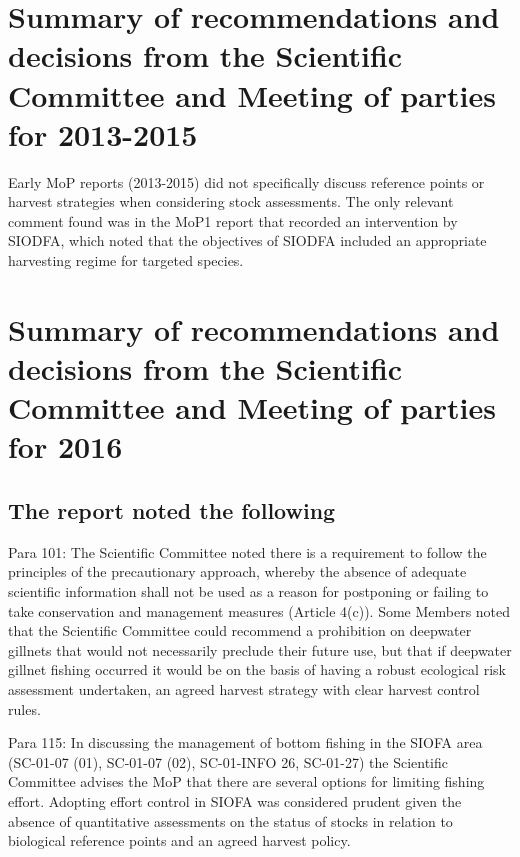 \section{Summary of recommendations and decisions from the Scientific Committee and Meeting of parties for 2013-2015}

Early MoP reports (2013-2015) did not specifically discuss reference points or harvest strategies when considering stock assessments. The only relevant comment found was in the MoP1 report \citep{MoP1} that recorded an intervention by SIODFA, which noted that the objectives of SIODFA included an appropriate harvesting regime for targeted species.

\section{Summary of recommendations and decisions from the Scientific Committee and Meeting of parties for 2016}

\subsection{The \cite{SC1} report noted the following}

Para 101: The Scientific Committee noted there is a requirement to follow the principles of the precautionary approach, whereby the absence of adequate scientific information shall not be used as a reason for postponing or failing to take conservation and management measures (Article 4(c)). Some Members noted that the Scientific Committee could recommend a prohibition on deepwater gillnets that would not necessarily preclude their future use, but that if deepwater gillnet fishing occurred it would be on the basis of having a robust ecological risk assessment undertaken, an agreed harvest strategy with clear harvest control rules.

Para 115: In discussing the management of bottom fishing in the SIOFA area (SC-01-07 (01), SC-01-07 (02), SC-01-INFO 26, SC-01-27) the Scientific Committee advises the MoP that there are several options for limiting fishing effort. Adopting effort control in SIOFA was considered prudent given the absence of quantitative assessments on the status of stocks in relation to biological reference points and an agreed harvest policy.

